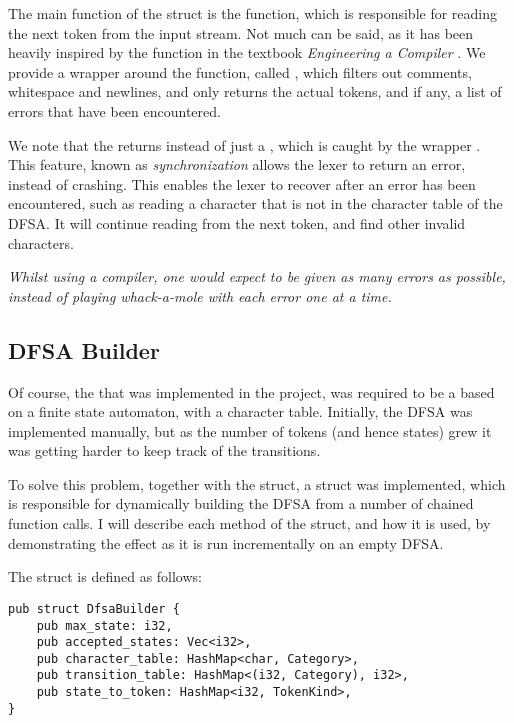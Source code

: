 The main function of the  struct is the  function,
which is responsible for reading the next token from the input stream. Not much
can be said, as it has been heavily inspired by the  function
in the textbook \textit{Engineering a Compiler} \cite{engineering-a-compiler}.
We provide a wrapper around the  function, called
, which filters out comments, whitespace and newlines, and only
returns the actual tokens, and if any, a list of errors that have been
encountered.


We note that the  returns 
instead of just a , which is caught by the wrapper .
This feature, known as \textit{synchronization} allows the lexer to return an
error, instead of crashing. This enables the lexer to recover after an error has
been encountered, such as reading a character that is not in the character table
of the DFSA. It will continue reading from the next token, and find other
invalid characters.

\begin{center}
    \textit{Whilst using a compiler, one would expect to
        be given as many errors as possible, instead of
        playing whack-a-mole with each error one at a time.}
\end{center}

\newpage

\subsection{DFSA Builder}

Of course, the  that was implemented in the project, was required to
be a based on a finite state automaton, with a character table. Initially, the
DFSA was implemented manually, but as the number of tokens (and hence states)
grew it was getting harder to keep track of the transitions.

To solve this problem, together with the  struct, a
 struct was implemented, which is responsible for dynamically
building the DFSA from a number of chained function calls. I will describe each
method of the  struct, and how it is used, by demonstrating
the effect as it is run incrementally on an empty DFSA.


The  struct is defined as follows:

\begin{mainbox}{}
    \lstset{xleftmargin=0cm}
    \begin{lstlisting}
pub struct DfsaBuilder {
    pub max_state: i32,
    pub accepted_states: Vec<i32>,
    pub character_table: HashMap<char, Category>,
    pub transition_table: HashMap<(i32, Category), i32>,
    pub state_to_token: HashMap<i32, TokenKind>,
}
    \end{lstlisting}
\end{mainbox}

